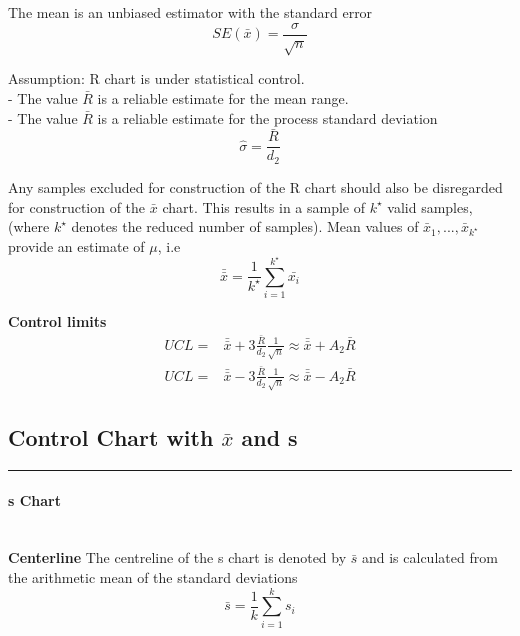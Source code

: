 The mean is an unbiased estimator with the standard error
\begin{equation}
  SE\left(\bar{x}\right) = \frac{\sigma}{\sqrt{n}}
\end{equation}

Assumption: R chart is under statistical control.\\
 - The value $\bar{R}$ is a reliable estimate for the mean range.\\
 - The value $\bar{R}$ is a reliable estimate for the process standard deviation
\begin{equation}
  \hat{\sigma} = \frac{\bar{R}}{d_2}
\end{equation}

Any samples excluded for construction of the R chart should also be disregarded for construction of the $\bar{x}$ chart.
This results in a sample of $k^\star$ valid samples, (where $k^\star$ denotes the reduced number of samples).
Mean values of $\bar{x}_1, ... ,\bar{x}_{k^\star}$ provide an estimate of $\mu$, i.e
\begin{equation}
  \bar{\bar{x}} = \frac{1}{k^\star} \sum^{k^\star}_{i=1} \bar{x_i}
\end{equation}

\textbf{Control limits}
\begin{equation}
  \begin{split}
    UCL =& \bar{\bar{x}} + 3\frac{\bar{R}}{d_2} \frac{1}{\sqrt{n}}\approx \bar{\bar{x}} + A_2 \bar{R}\\
    UCL =& \bar{\bar{x}} - 3\frac{\bar{R}}{d_2} \frac{1}{\sqrt{n}}\approx \bar{\bar{x}} - A_2 \bar{R}
  \end{split}
\end{equation}

\subsection{Control Chart with $\bar{x}$ and s}
\noindent\rule[\linienAbstand]{\linewidth}{\linienDicke}

\paragraph{s Chart}\mbox{}\\
\textbf{Centerline}
The centreline of the s chart is denoted by $\bar{s}$ and is calculated from the arithmetic mean of the standard deviations\\
\begin{equation}
  \bar{s} = \frac{1}{k} \sum^k_{i=1} s_i
\end{equation}

